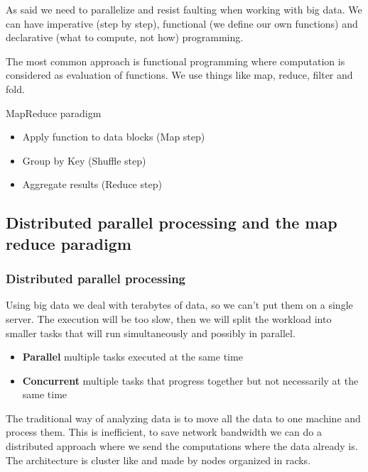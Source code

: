 As said we need to parallelize and resist faulting when working with big data. We can have imperative (step by step), functional (we define our own functions) and declarative (what to compute, not how) programming. 

\vspace{10pt}

The most common approach is functional programming where computation is considered as evaluation of functions. We use things like map, reduce, filter and fold.

\vspace{10pt}

MapReduce paradigm
\begin{itemize}
    \item Apply function to data blocks (Map step)
    \item Group by Key (Shuffle step)
    \item Aggregate results (Reduce step)
\end{itemize}


\subsection{Distributed parallel processing and the map reduce paradigm}

\subsubsection{Distributed parallel processing}

Using big data we deal with terabytes of data, so we can't put them on a single server. The execution will be too slow, then we will split the workload into smaller tasks that will run simultaneously and possibly in parallel. 

\begin{itemize}
    \item \textbf{Parallel} \ra multiple tasks executed at the same time
    \item \textbf{Concurrent} \ra multiple tasks that progress together but not necessarily at the same time
\end{itemize}

The traditional way of analyzing data is to move all the data to one machine and process them. This is inefficient, to save network bandwidth we can do a distributed approach where we send the computations where the data already is. The architecture is cluster like and made by nodes organized in racks. 


